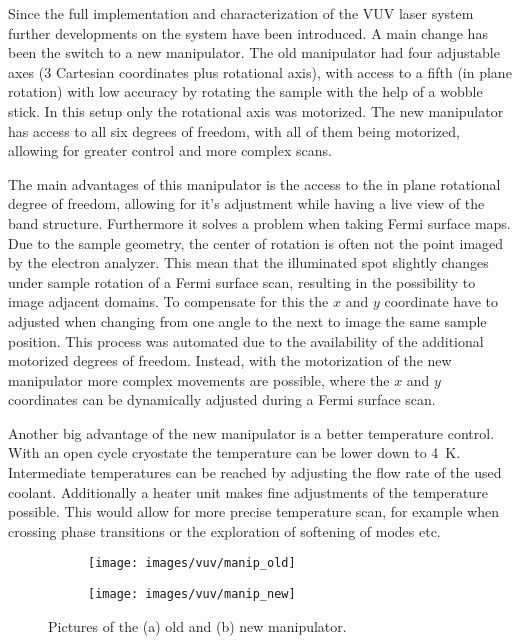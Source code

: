 Since the full implementation and characterization of the VUV laser system further developments on the system have been introduced.
A main change has been the switch to a new manipulator.
The old manipulator had four adjustable axes (3 Cartesian coordinates plus rotational axis), with access to a fifth (in plane rotation) with low accuracy by rotating the sample with the help of a wobble stick.
In this setup only the rotational axis was motorized.
The new manipulator has access to all six degrees of freedom, with all of them being motorized, allowing for greater control and more complex scans.

The main advantages of this manipulator is the access to the in plane rotational degree of freedom, allowing for it's adjustment while having a live view of the band structure.
Furthermore it solves a problem when taking Fermi surface maps.
Due to the sample geometry, the center of rotation is often not the point imaged by the electron analyzer.
This mean that the illuminated spot slightly changes under sample rotation of a Fermi surface scan, resulting in the possibility to image adjacent domains.
To compensate for this the $x$ and $y$ coordinate have to adjusted when changing from one angle to the next to image the same sample position.
This process was automated due to the availability of the additional motorized degrees of freedom.
Instead, with the motorization of the new manipulator more complex movements are possible, where the $x$ and $y$ coordinates can be dynamically adjusted during a Fermi surface scan.

Another big advantage of the new manipulator is a better temperature control.
With an open cycle cryostate the temperature can be lower down to \qty{4}{\kelvin}.
Intermediate temperatures can be reached by adjusting the flow rate of the used coolant.
Additionally a heater unit makes fine adjustments of the temperature possible.
This would allow for more precise temperature scan, for example when crossing phase transitions or the exploration of softening of modes etc.

\begin{figure}[h]
	\centering
	\begin{subfigure}[b]{0.46\textwidth}
		\texttt{[image: images/vuv/manip\_old]}
		\caption{}
	\end{subfigure}
	\begin{subfigure}[b]{0.46\textwidth}
		\texttt{[image: images/vuv/manip\_new]}
		\caption{}
	\end{subfigure}
	\caption{Pictures of the (a) old and (b) new manipulator.}
	\label{fig:manip_full}
\end{figure}

